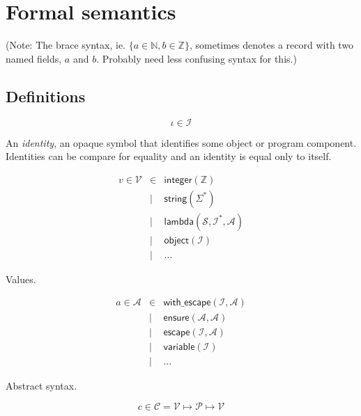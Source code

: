 \documentclass{article}
\begin{document}
\newcommand{\op}[1]{\mathsf{#1}}
\newcommand{\cnt}{c}
\newcommand{\scst}{\sigma}
\newcommand{\dyst}{\delta}
\newcommand{\pest}{\pi}
\newcommand{\sym}{\iota}
\newcommand{\prop}[1]{\mathsf{#1}}
\newcommand{\fun}[1]{\mathsf{#1}}
\newcommand{\type}[1]{\mathcal{#1}}
\newcommand{\val}[1]{\mathsf{#1}}
\newcommand{\eval}{\mathcal{E}}
\newcommand{\syn}[1]{\mathsf{#1}}
\newcommand{\bif}{\quad \mathbf{if} \quad}

\section{Formal semantics}

(Note: The brace syntax, ie. $\{ a \in \mathbb{N}, b \in \mathbb{Z} \}$,
sometimes denotes a record with two named fields, $a$ and $b$. Probably need
less confusing syntax for this.)

\subsection{Definitions}

\[ \sym \in \type{I} \]

An \emph{identity}, an opaque symbol that identifies some object or program
component. Identities can be compare for equality and an identity is equal only
to itself.

\begin{eqnarray*}
v \in \type{V}
& \in & \val{integer}(\mathbb{Z}) \\
& | & \val{string}(\Sigma^*) \\
& | & \val{lambda}(\type{S}, \type{I}^*, \type{A}) \\
& | & \val{object}(\type{I}) \\
& | & \ldots
\end{eqnarray*}

Values.

\begin{eqnarray*}
a \in \type{A}
& \in & \syn{with\_escape}(\type{I}, \type{A}) \\
& | & \syn{ensure}(\type{A}, \type{A}) \\
& | & \syn{escape}(\type{I}, \type{A}) \\
& | & \syn{variable}(\type{I}) \\
& | & \ldots
\end{eqnarray*}

Abstract syntax.

\[ \cnt \in \type{C} = \type{V} \mapsto \type{P} \mapsto \type{V} \]
\end{document}
